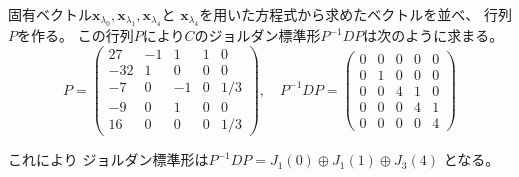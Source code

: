 \documentclass[12pt,b5paper]{ltjsarticle}
\begin{document}
固有ベクトル$\bm{x}_{\lambda_0},\bm{x}_{\lambda_1},\bm{x}_{\lambda_4}$と
$\bm{x}_{\lambda_4}$を用いた方程式から求めたベクトルを並べ、
行列$P$を作る。
この行列$P$により$C$のジョルダン標準形$P^{-1}DP$は次のように求まる。
\begin{equation}
 P=
 \begin{pmatrix}
  27 & -1 & 1 & 1 & 0\\
  -32 & 1 & 0 & 0 & 0\\
  -7 & 0 & -1 & 0 & 1/3\\
  -9 & 0 & 1 & 0 & 0\\
  16 & 0 & 0 & 0 & 1/3
 \end{pmatrix}
 ,\quad
 P^{-1}DP=
 \begin{pmatrix}
  0 & 0 & 0 & 0 & 0 \\
  0 & 1 & 0 & 0 & 0 \\
  0 & 0 & 4 & 1 & 0\\
  0 & 0 & 0 & 4 & 1\\
  0 & 0 & 0 & 0 & 4
 \end{pmatrix}
\end{equation}

これにより
ジョルダン標準形は$P^{-1}DP = J_1(0) \oplus J_1(1) \oplus J_3(4)$
となる。

\hrulefill
\end{document}

